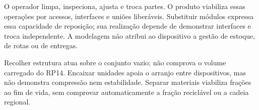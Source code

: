 O operador limpa, inspeciona, ajusta e troca partes. O produto viabiliza essas operações por acessos, interfaces e uniões liberáveis. Substituir módulos expressa essa capacidade de reposição; sua realização depende de demonstrar interfaces e troca independente. A modelagem não atribui ao dispositivo a gestão de estoque, de rotas ou de entregas.

Recolher estrutura atua sobre o conjunto vazio; não comprova o volume carregado do RP14. Encaixar unidades apoia o arranjo entre dispositivos, mas não demonstra compressão nem estabilidade. Separar materiais viabiliza frações ao fim de vida, sem comprovar automaticamente a fração reciclável ou a cadeia regional.

